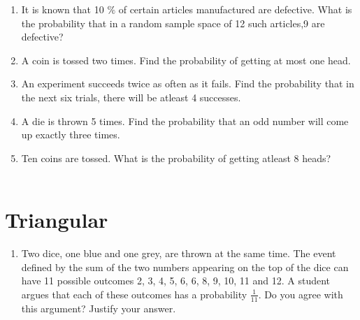 \begin{enumerate}[label=\thesection.\arabic*,ref=\thesection.\theenumi]
\\
\solution

\item It is known that 10 $\%$ of certain articles manufactured are defective. What is the probability that in a random sample space of 12 such articles,9 are defective? \\
\solution

\item A coin is tossed two times. Find the probability of getting at most one head.
\\
\solution

\item An experiment succeeds twice as often as it fails. Find the probability that in the next
six trials, there will be atleast 4 successes.
\solution

\item A die is thrown 5 times. Find the probability that an odd number will come up exactly three times.
		\solution
	
 \item Ten coins are tossed. What is the probability of getting atleast 8 heads?
 \\
 \solution
 \\
 
    \end{enumerate}
    \section{Triangular}
\begin{enumerate}[label=\thesection.\arabic*,ref=\thesection.\theenumi]
	\item Two dice, one blue and one grey, are thrown at the same time.   The event defined by the sum of the two numbers appearing on the top of the dice can have 11 possible outcomes 2, 3, 4, 5, 6, 6, 8, 9, 10, 11 and 12.  A student argues that each of these outcomes has a probability $\frac{1}{11}$.  Do you agree with this argument?  Justify your answer.
    \end{enumerate}
